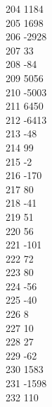 { 204	1184 \\
 205	1698 \\
 206	-2928 \\
 207	33 \\
 208	-84 \\
 209	5056 \\
 210	-5003 \\
 211	6450 \\
 212	-6413 \\
 213	-48 \\
 214	99 \\
 215	-2 \\
 216	-170 \\
 217	80 \\
 218	-41 \\
 219	51 \\
 220	56 \\
 221	-101 \\
 222	72 \\
 223	80 \\
 224	-56 \\
 225	-40 \\
 226	8 \\
 227	10 \\
 228	27 \\
 229	-62 \\
 230	1583 \\
 231	-1598 \\
 232	110 \\
}
